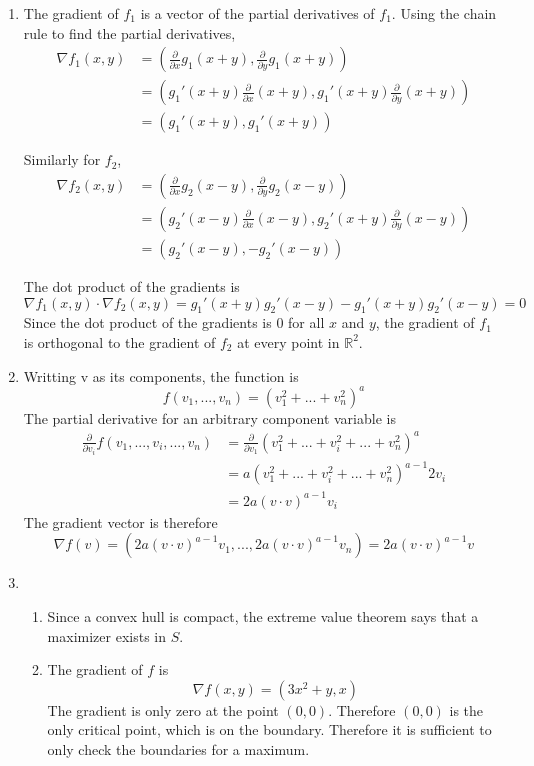 \documentclass{report}
\newcommand{\pdiv}[1]{\frac{\partial}{\partial #1}}
\begin{document}
\begin{enumerate}
	\item 
	The gradient of $f_1$ is a vector of the partial derivatives of $f_1$.
	Using the chain rule to find the partial derivatives, 
	\begin{align*}
		\nabla f_1(x,y) 
		&= (\pdiv{x} g_1(x+y), \pdiv{y} g_1(x+y)) \\
		&= (g_1'(x+y)\pdiv{x} (x+y), g_1'(x+y)\pdiv{y} (x+y)) \\
		&= (g_1'(x+y), g_1'(x+y))
	\end{align*}

	Similarly for $f_2$, 
	\begin{align*}
		\nabla f_2(x,y) 
		&= (\pdiv{x} g_2(x-y), \pdiv{y} g_2(x-y)) \\
		&= (g_2'(x-y)\pdiv{x} (x-y), g_2'(x+y)\pdiv{y} (x-y)) \\
		&= (g_2'(x-y), -g_2'(x-y))
	\end{align*}

	The dot product of the gradients is 
	\[
		\nabla f_1(x,y) \cdot \nabla f_2(x,y)
		= g_1'(x+y)g_2'(x-y) - g_1'(x+y)g_2'(x-y)
		= 0
	\]
	Since the dot product of the gradients is 0 
	for all $x$ and $y$,
	the gradient of $f_1$ is orthogonal to the gradient of $f_2$
	at every point in $\mathbb{R}^2$.

	\item 
	Writting v as its components, the function is 
	\[
		f(v_1,...,v_n) = (v_1^2 + ... + v_n^2)^a
	\]
	The partial derivative for an arbitrary component variable is 
	\begin{align*}
		\pdiv{v_i} f(v_1,..., v_i,...,v_n) 
		&= \pdiv{v_1} (v_1^2 + ... + v_i^2 + ...+ v_n^2)^a \\
		&= a(v_1^2 + ... + v_i^2 + ...+ v_n^2)^{a-1}2v_i \\
		&= 2a(v\cdot v)^{a-1}v_i
	\end{align*}
	The gradient vector is therefore 
	\[
		\nabla f(v) = 
		(2a(v\cdot v)^{a-1}v_1,...,2a(v\cdot v)^{a-1}v_n) =
		2a(v\cdot v)^{a-1}v
	\]

	\item 
	\begin{enumerate}
		\item 
		Since a convex hull is compact, 
		the extreme value theorem says that a maximizer
		exists in $S$.

		\item 
		The gradient of $f$ is
		\[
			\nabla f(x, y) = (3x^2+y, x)
		\]
		The gradient is only zero at the point $(0, 0)$.
		Therefore $(0, 0)$ is the only critical point, which is on the boundary.
		Therefore it is sufficient to only check the boundaries for a maximum.


\end{enumerate}
\end{enumerate}
\end{document}
